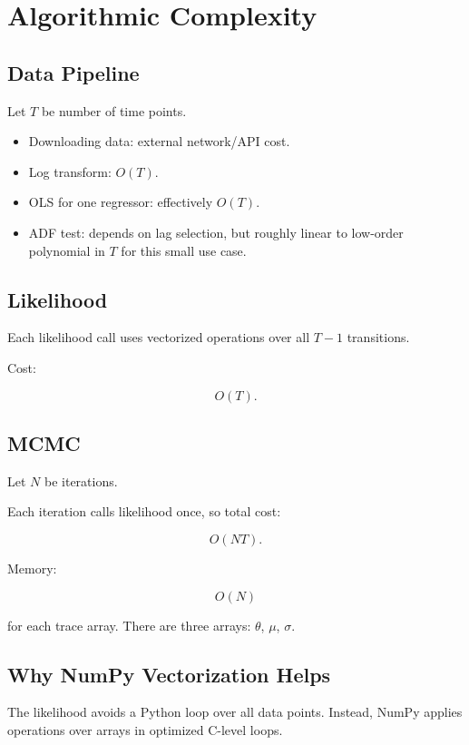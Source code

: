 \documentclass[11pt]{article}
\begin{document}
\section{Algorithmic Complexity}

\subsection{Data Pipeline}

Let $T$ be number of time points.

\begin{itemize}
  \item Downloading data: external network/API cost.
  \item Log transform: $O(T)$.
  \item OLS for one regressor: effectively $O(T)$.
  \item ADF test: depends on lag selection, but roughly linear to low-order
  polynomial in $T$ for this small use case.
\end{itemize}

\subsection{Likelihood}

Each likelihood call uses vectorized operations over all $T-1$ transitions.

Cost:

\[
O(T).
\]

\subsection{MCMC}

Let $N$ be iterations.

Each iteration calls likelihood once, so total cost:

\[
O(NT).
\]

Memory:

\[
O(N)
\]

for each trace array. There are three arrays: $\theta$, $\mu$, $\sigma$.

\subsection{Why NumPy Vectorization Helps}

The likelihood avoids a Python loop over all data points. Instead, NumPy applies
operations over arrays in optimized C-level loops.
\end{document}
